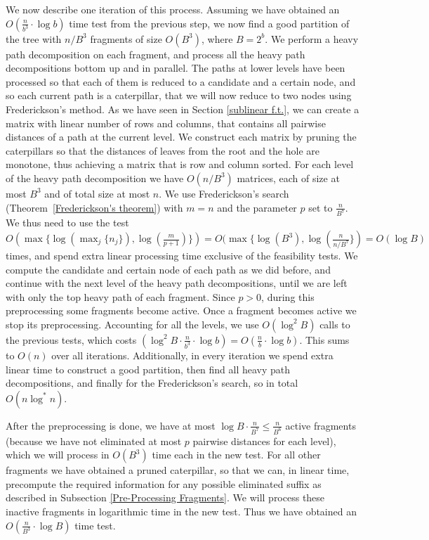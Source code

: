 \documentclass[11pt,a4paper]{article}
\theoremstyle{definition}
\theoremstyle{remark}
\begin{document}
We now describe one iteration of this process. Assuming we have obtained an $O(\frac{n}{b^3} \cdot \log b)$ time 
test from the previous step, we now find a good partition of the tree with $n/B^{3}$ fragments of size $O(B^3)$, 
where $B=2^b$. We perform a heavy path decomposition on each fragment, and process all the heavy
path decompositions bottom up and in parallel. The paths at lower levels have been processed so that each of them is
reduced to a candidate and a certain node, and so each current path is a caterpillar, that we will now reduce to
two nodes using Frederickson's method. As we have seen in Section \ref{sublinear f.t.}, we can create a matrix 
with linear number of rows and columns, that contains all pairwise distances of a path at the current level. We 
construct each matrix by pruning the caterpillars so that the distances of leaves from the root and the hole are monotone, thus achieving a matrix that is row and column sorted. For each level of the heavy path decomposition
we have $O(n/B^3)$ matrices, each of size at most $B^{3}$ and of total size at most $n$.
We use Frederickson's search (Theorem~\ref{Frederickson's theorem}) with $m=n$ and the parameter $p$ set to $\frac{n}{B^7}$. We thus need to use the
test $O(\max \lbrace \log(\max_{j} \lbrace n_j \rbrace), \log(\frac{m}{p+1}) \rbrace) = O(\max \lbrace \log (B^{3}), \log(\frac{n}{n/B^{7}} \rbrace) = O(\log B)$ times, and spend extra linear processing time exclusive of the feasibility tests. We compute the candidate and certain node of each path as we did before, and continue with the next level
of the heavy path decompositions, until we are left with only the top heavy path of each fragment.
Since $p>0$, during this preprocessing some fragments become active. Once a fragment becomes active we stop
its preprocessing. Accounting for all the levels, we use $O(\log^{2}B)$ calls to the previous tests,
which costs $(\log ^2B \cdot \frac{n}{b^3} \cdot \log b)=O(\frac{n}{b} \cdot \log b)$. This sums to $O(n)$
over all iterations.
Additionally, in every iteration we spend extra linear time to construct a good partition, then find all heavy
path decompositions, and finally for the Frederickson's search, so in total $O(n \log ^*n)$. 

After the preprocessing is done, we have at most $\log B \cdot \frac{n}{B^7}\leq \frac{n}{B^{6}}$ active fragments (because we have not eliminated at most $p$ pairwise distances for each level), which we will process in $O(B^{3})$
time each in the new test. For all other fragments we have obtained a pruned caterpillar, so that we can, in linear time, precompute the required information for any possible eliminated suffix as described in Subsection \ref{Pre-Processing Fragments}. We will process these inactive fragments in logarithmic time in the new test. Thus we have obtained an $O(\frac{n}{B^3} \cdot \log B)$ time test.
\end{document}
